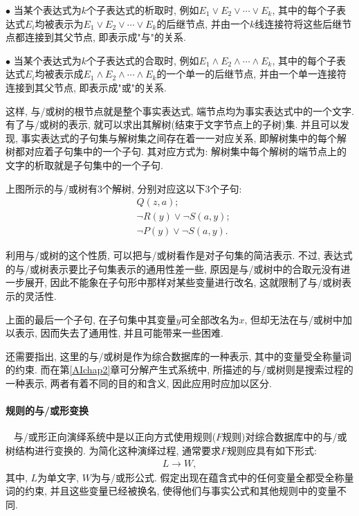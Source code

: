\begin{example}
$\bullet$ 当某个表达式为$k$个子表达式的析取时, 例如$E_1\vee E_2\vee \cdots \vee E_k$, 其中的每个子表达式$E_i$均被表示为$E_1\vee E_2\vee \cdots \vee E_k$的后继节点, 并由一个$k$线连接符将这些后继节点都连接到其父节点, 即表示成"与"的关系.

$\bullet$ 当某个表达式为$k$个子表达式的合取时, 例如$E_1\wedge E_2\wedge \cdots \wedge E_k$, 其中的每个子表达式$E_i$均被表示成$E_1\wedge E_2\wedge \cdots \wedge E_k$的一个单一的后继节点, 并由一个单一连接符连接到其父节点, 即表示成"或"的关系.

这样, 与/或树的根节点就是整个事实表达式, 端节点均为事实表达式中的一个文字. 有了与/或树的表示, 就可以求出其解树(结束于文字节点上的子树)集. 并且可以发现, 事实表达式的子句集与解树集之间存在着一一对应关系, 即解树集中的每个解树都对应着子句集中的一个子句.
其对应方式为: 解树集中每个解树的端节点上的文字的析取就是子句集中的一个子句.

上图所示的与/或树有3个解树, 分别对应这以下3个子句:
\begin{align*}
    &Q(z, a);\\
    &\neg R(y)\vee  \neg  S(a, y);\\
    &\neg P(y)\vee  \neg  S(a, y).
\end{align*}
\end{example}

利用与/或树的这个性质, 可以把与/或树看作是对子句集的简洁表示. 不过, 表达式的与/或树表示要比子句集表示的通用性差一些, 原因是与/或树中的合取元没有进一步展开, 因此不能象在子句形中那样对某些变量进行改名, 这就限制了与/或树表示的灵活性.
\begin{example}
  上面的最后一个子句, 在子句集中其变量$y$可全部改名为$x$, 但却无法在与/或树中加以表示, 因而失去了通用性, 并且可能带来一些困难.
\end{example}

还需要指出, 这里的与/或树是作为综合数据库的一种表示, 其中的变量受全称量词的约束. 而在第\ref{AIchap2}章可分解产生式系统中, 所描述的与/或树则是搜索过程的一种表示, 两者有着不同的目的和含义, 因此应用时应加以区分.
\paragraph{规则的与/或形变换}~{}
与/或形正向演绎系统中是以正向方式使用规则($F$规则)对综合数据库中的与/或树结构进行变换的. 为简化这种演绎过程, 通常要求$F$规则应具有如下形式:
\begin{align}
  L\rightarrow W,
\end{align}
其中, $L$为单文字, $W$为与/或形公式. 假定出现在蕴含式中的任何变量全都受全称量词的约束, 并且这些变量已经被换名, 使得他们与事实公式和其他规则中的变量不同.

